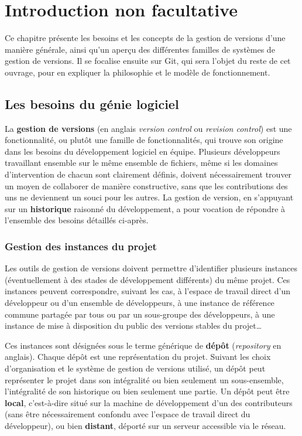 \chapter{Introduction non facultative}\label{chapIntro}

Ce chapitre présente les besoins et les concepts de la gestion de
versions d'une manière générale, ainsi qu'un aperçu des différentes
familles de systèmes de gestion de versions. Il se focalise ensuite sur
Git, qui sera l'objet du reste de cet ouvrage, pour en expliquer la
philosophie et le modèle de fonctionnement.

\section{Les besoins du génie logiciel}

La \textbf{gestion de versions} (en anglais
\textit{version control} ou \textit{revision control}) est une
fonctionnalité, ou plutôt une famille de fonctionnalités, qui trouve
son origine dans les besoins du développement logiciel en
équipe. Plusieurs développeurs travaillant ensemble sur le même
ensemble de fichiers, même si les domaines d'intervention de chacun
sont clairement définis, doivent nécessairement trouver un moyen de
collaborer de manière constructive, sans que les contributions des uns
ne deviennent un souci pour les autres. La gestion de version, en
s'appuyant sur un \textbf{historique} raisonné du
développement, a pour vocation de répondre à l'ensemble des besoins
détaillés ci-après.

\subsection{Gestion des instances du projet}

Les outils de gestion de versions doivent permettre d'identifier
plusieurs instances (éventuellement à des stades de développement
différents) du même projet. Ces instances peuvent correspondre,
suivant les cas, à l'espace de travail direct d'un développeur ou d'un
ensemble de développeurs, à une instance de référence commune partagée
par tous ou par un sous-groupe des développeurs, à une instance de
mise à disposition du public des versions stables du projet\ldots

Ces instances sont désignées sous le terme générique de
\textbf{dépôt} (\textit{repository} en
anglais). Chaque dépôt est une représentation du projet. Suivant les
choix d'organisation et le système de gestion de versions utilisé, un
dépôt peut représenter le projet dans son intégralité ou bien
seulement un sous-ensemble, l'intégralité de son historique ou bien
seulement une partie. Un dépôt peut être
\textbf{local}, c'est-à-dire situé sur la
machine de développement d'un des contributeurs (sans être
nécessairement confondu avec l'espace de travail direct du
développeur), ou bien \textbf{distant},
déporté sur un serveur accessible via le réseau.

